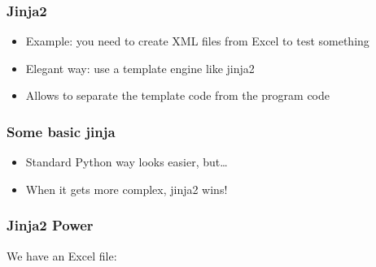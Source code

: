 \documentclass[ngerman]{beamer}
\begin{document}
\begin{frame}
\frametitle{Jinja2}

\begin{itemize}
\item Example: you need to create XML files from Excel to test something
\item Elegant way: use a template engine like jinja2
\item Allows to separate the template code from the program code
\end{itemize}
\end{frame}

\begin{frame}[fragile]
\frametitle{Some basic jinja}




\begin{itemize}
	\item Standard Python way looks easier, but\ldots
	\item When it gets more complex, jinja2 wins!
\end{itemize}

\end{frame}

\begin{frame}[fragile]
\frametitle{Jinja2 Power}

We have an Excel file:\vspace*{1em}



\end{frame}
\end{document}
